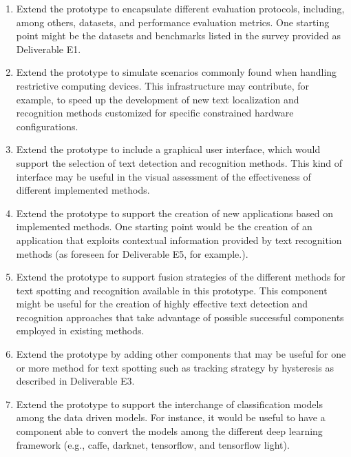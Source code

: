 \begin{enumerate}

    \item Extend the prototype to encapsulate different evaluation protocols, including, among others, datasets, and performance evaluation metrics. One starting point might be the datasets and benchmarks listed in the survey provided as Deliverable E1.
    
    \item Extend the prototype to simulate scenarios commonly found when handling restrictive computing devices. This infrastructure may contribute, for example, to speed up the development of new text localization and recognition methods customized for specific constrained hardware configurations.
    
    \item Extend the prototype to include a graphical user interface, which would support the selection of text detection and recognition methods. This kind of interface may be useful in the visual assessment of the effectiveness of different implemented methods.
    
    \item Extend the prototype to support the creation of new applications based on implemented methods. One starting point would be the creation of an application that exploits contextual information provided by text recognition methods (as foreseen for Deliverable E5, for example.).
    
    \item Extend the prototype to support fusion strategies of the different methods for text spotting and recognition available in this prototype. This component might be useful for the creation of highly effective text detection and recognition approaches that take advantage of possible successful components employed in existing methods.
    
    \item Extend the prototype by adding other components that may be useful for one or more method for text spotting such as tracking strategy by hysteresis as described in Deliverable E3.
    
    \item Extend the prototype to support the interchange of classification models among the data driven models. For instance, it would be useful to have a component able to convert the models among the different deep learning framework (e.g., caffe, darknet, tensorflow, and tensorflow light). 
    
\end{enumerate}
%










